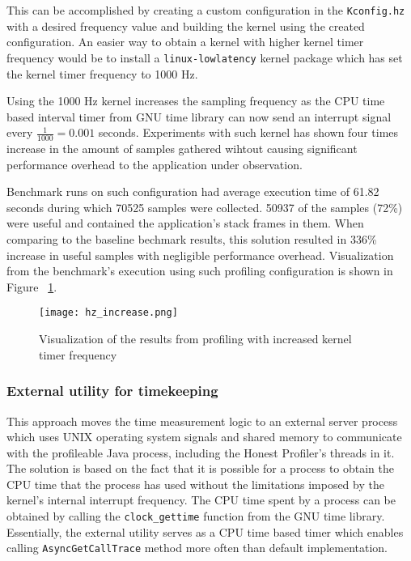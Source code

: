 \documentclass[..thesis.tex]{subfiles}
\begin{document}
This can be accomplished by creating a custom configuration in the \texttt{Kconfig.hz} with a desired frequency value and building the kernel using the created configuration. An easier way to obtain a kernel with higher kernel timer frequency would be to install a \texttt{linux-lowlatency} kernel package which has set the kernel timer frequency to 1000 Hz.

Using the 1000 Hz kernel increases the sampling frequency as the CPU time based interval timer from GNU time library can now send an interrupt signal every $\frac{1}{1000} = 0.001$ seconds. Experiments with such kernel has shown four times increase in the amount of samples gathered wihtout causing significant performance overhead to the application under observation.

Benchmark runs on such configuration had average execution time of 61.82 seconds during which 70525 samples were collected. 50937 of the samples (72\%) were useful and contained the application's stack frames in them. When comparing to the baseline bechmark results, this solution resulted in 336\% increase in useful samples with negligible performance overhead. Visualization from the benchmark's execution using such profiling configuration is shown in Figure ~\ref{fig:hz_increase}.
\begin{figure}[H]
\texttt{[image: hz\_increase.png]}
\caption{Visualization of the results from profiling with increased kernel timer frequency}
\label{fig:hz_increase}
\end{figure}

\subsubsection{External utility for timekeeping}
\label{shared-mem}

This approach moves the time measurement logic to an external server process which uses UNIX operating system signals and shared memory to communicate with the profileable Java process, including the Honest Profiler's threads in it. The solution is based on the fact that it is possible for a process to obtain the CPU time that the process has used without the limitations imposed by the kernel's internal interrupt frequency. The CPU time spent by a process can be obtained by calling the \texttt{clock\_\-gettime} function from the GNU time library. Essentially, the external utility serves as a CPU time based timer which enables calling \texttt{Async\-Get\-Call\-Trace} method more often than default implementation.
\end{document}

